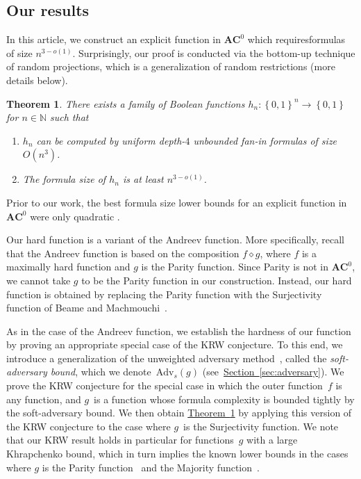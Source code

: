 \documentclass[11pt]{article}
\numberwithin{equation}{section}
\newtheorem{theorem}{Theorem}[section]
\theoremstyle{definition}
\theoremstyle{plain}
\newcommand{\N}{\mathbb N}
\newcommand{\expref}[2]{\hyperref[#2]{#1~\ref{#2}}}
\theoremstyle{definition}\newtheorem{notation}[theorem]{Notation}\theoremstyle{plain}
\renewcommand{\N}{\mathbb{N}}
\newcommand{\B}{\left\{ 0,1 \right \}}
\newcommand{\ACz}{\boldsymbol{AC}^{0}}
\newcommand{\Am}{\mathrm{Adv}_{s}}
\renewcommand{\d}{\diamond}
\theoremstyle{definition}
\theoremstyle{plain}
\begin{document}
\subsection{Our results}

In this %
article,  %
we construct an explicit function in $\ACz$ which requiresformulas of size $n^{3-o(1)}$. Surprisingly, our proof
is conducted via the bottom-up technique of random projections, which
is a generalization of random restrictions (more details below).
\begin{theorem}
\label{thm:main}There exists a family of Boolean functions $h_{n}\colon\B^{n}\to\B$
for $n\in\N$ such that 
\begin{enumerate}
\item $h_{n}$ can be computed by uniform depth-$4$ unbounded fan-in formulas
of size $O(n^{3})$. 
\item The formula size of $h_{n}$ is at least $n^{3-o(1)}$.
\end{enumerate}
\end{theorem}

Prior to our work, the best formula size lower bounds
%
for  %
an explicit
function in $\ACz$ were only quadratic \cite{N66,CKK12,JuknaBook,BM12}.

Our hard function is a variant of the Andreev function. More specifically,
recall that the Andreev function is based on the composition $f\d g$,
where $f$ is a maximally hard function and $g$ is the Parity function.
Since Parity is not in $\ACz$, we cannot take $g$ to be the Parity
function in our construction. Instead, our hard function is obtained
by replacing the Parity function with the Surjectivity function of Beame and Machmouchi~\cite{BM12}.

As in the case of the Andreev function, we establish the hardness
of our function by proving an appropriate special case of the KRW
conjecture. To this end, we introduce a generalization of the unweighted
%
adversary method~\cite{A02}, called the \emph{soft-adversary bound}, which we
denote~$\Am(g)$ (see~\expref{Section}{sec:adversary}). We prove the KRW
conjecture for the special case in which the outer function~$f$
is any function, and $g$~is a function whose formula complexity
is bounded tightly by the soft-adversary bound. We then obtain \expref{Theorem}{thm:main}
by applying this version of the KRW conjecture to the case where $g$~is
the Surjectivity function. We note that our KRW result holds in particular
for functions~$g$ with a large Khrapchenko bound, which in turn
implies the known lower bounds in the cases where $g$ is the Parity
function~\cite{H98} and the Majority function~\cite{GTN19}.
\end{document}
